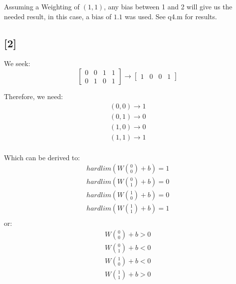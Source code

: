 \documentclass[paper=a4, fontsize=12pt]{article}%
\begin{document}
Assuming a Weighting of $(1,1)$, any bias between 1 and 2 will give us the needed result, in this case, a bias of $1.1$ was used.
See q4.m for results.
\subsection{[2]}
We seek: \\
\begin{equation}
	\begin{bmatrix}
	    0	&0	&1	&1\\
	    0	&1	&0	&1
	\end{bmatrix}
	\rightarrow
	\begin{bmatrix}
	    1	&0	&0	&1
	\end{bmatrix}
\end{equation}

Therefore, we need: \\
\begin{equation}
	\begin{aligned}
		(0,0) \rightarrow 1 \\
		(0,1) \rightarrow 0 \\
		(1,0) \rightarrow 0 \\
		(1,1) \rightarrow 1 \\
	\end{aligned}
\end{equation}

Which can be derived to: \\
\begin{equation}
	\begin{aligned}
		hardlim(W \binom{0}{0}+ b) = 1 \\
		hardlim(W \binom{0}{1}+ b) = 0 \\
		hardlim(W \binom{1}{0}+ b) = 0 \\
		hardlim(W \binom{1}{1}+ b) = 1 \\
	\end{aligned}
\end{equation}
or: \\
\begin{equation}
	\begin{aligned}
		W \binom{0}{0}+ b > 0 \\
		W \binom{0}{1}+ b < 0 \\
		W \binom{1}{0}+ b < 0 \\
		W \binom{1}{1}+ b > 0 \\
	\end{aligned}
\end{equation}
\end{document}
